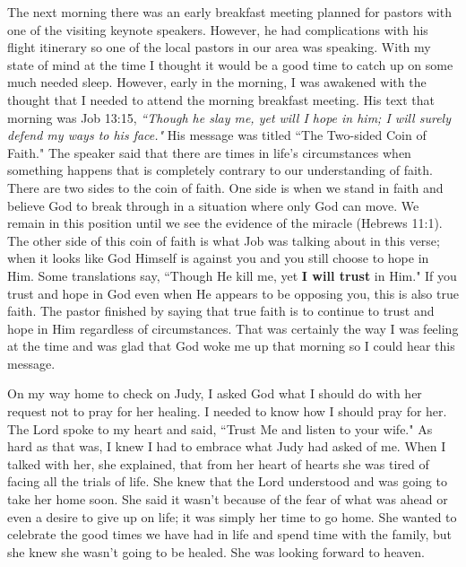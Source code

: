 \documentclass[oneside,12pt]{book}
\begin{document}
The next morning there was an early breakfast meeting planned for pastors with one of the visiting keynote speakers. However, he had complications with his flight itinerary so one of the local pastors in our area was speaking. With my state of mind at the time I thought it would be a good time to catch up on some much needed sleep. However, early in the morning, I was awakened with the thought that I needed to attend the morning breakfast meeting. His text that morning was Job 13:15, \textit{``Though he slay me, yet will I hope in him; I will surely defend my ways to his face."} His message was titled ``The Two-sided Coin of Faith." The speaker said that there are times in life's circumstances when something happens that is completely contrary to our understanding of faith. There are two sides to the coin of faith. One side is when we stand in faith and believe God to break through in a situation where only God can move. We remain in this position until we see the evidence of the miracle (Hebrews 11:1). The other side of this coin of faith is what Job was talking about in this verse; when it looks like God Himself is against you and you still choose to hope in Him. Some translations say, ``Though He kill me, yet \textbf{I will trust} in Him." If you trust and hope in God even when He appears to be opposing you, this is also true faith. The pastor finished by saying that true faith is to continue to trust and hope in Him regardless of circumstances. That was certainly the way I was feeling at the time and was glad that God woke me up that morning so I could hear this message.

On my way home to check on Judy, I asked God what I should do with her request not to pray for her healing. I needed to know how I should pray for her. The Lord spoke to my heart and said, ``Trust Me and listen to your wife." As hard as that was, I knew I had to embrace what Judy had asked of me. When I talked with her, she explained, that from her heart of hearts she was tired of facing all the trials of life. She knew that the Lord understood and was going to take her home soon. She said it wasn't because of the fear of what was ahead or even a desire to give up on life; it was simply her time to go home. She wanted to celebrate the good times we have had in life and spend time with the family, but she knew she wasn't going to be healed. She was looking forward to heaven. 
\end{document}
